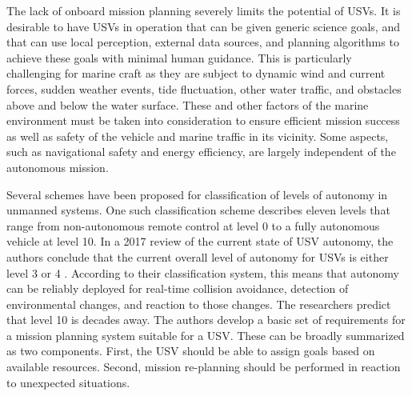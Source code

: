 \documentclass{tamuccthesis}
\begin{document}
The lack of onboard mission planning severely limits the potential of USVs. It is desirable to have USVs in operation that can be given generic science goals, and that can use local perception, external data sources, and planning algorithms to achieve these goals with minimal human guidance. This is particularly challenging for marine craft as they are subject to dynamic wind and current forces, sudden weather events, tide fluctuation, other water traffic, and obstacles above and below the water surface. These and other factors of the marine environment must be taken into consideration to ensure efficient mission success as well as safety of the vehicle and marine traffic in its vicinity. Some aspects, such as navigational safety and energy efficiency, are largely independent of the autonomous mission. 

Several schemes have been proposed for classification of levels of autonomy in unmanned systems. One such classification scheme describes eleven levels that range from non-autonomous remote control at level 0 to a fully autonomous vehicle at level 10. In a 2017 review of the current state of USV autonomy, the authors conclude that the current overall level of autonomy for USVs is either level 3 or 4 \cite{heo2017case}. According to their classification system, this means that autonomy can be reliably deployed for real-time collision avoidance, detection of environmental changes, and reaction to those changes. The researchers predict that level 10 is decades away. The authors develop a basic set of requirements for a mission planning system suitable for a USV. These can be broadly summarized as two components. First, the USV should be able to assign goals based on available resources. Second, mission re-planning should be performed in reaction to unexpected situations. 
\end{document}
